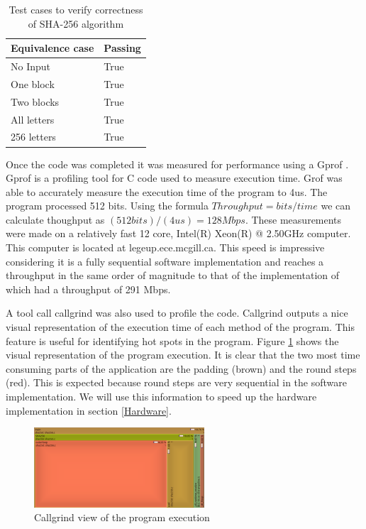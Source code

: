 \documentclass[conference]{IEEEtran}
\begin{document}
\begin{table}
\begin{center}
	\caption{Test cases to verify correctness of SHA-256 algorithm}
    \begin{tabular}{| l | l |}
    \hline
    \label{tab:tests}
    Equivalence case	 & Passing \\ \hline\hline
	No Input & True \\ \hline
	One block & True\\ \hline
	Two blocks & True \\ \hline
	All letters & True \\ \hline
	256 letters & True \\  \hline
    \hline 
    \end{tabular} 
\end{center}  
\end{table}

Once the code was completed it was measured for performance using a Gprof \cite{gprof}. Gprof is a profiling tool for C code used to measure execution time. Grof was able to accurately measure the execution time of the program to 4us. The program processed 512 bits. Using the formula $Throughput = bits/time$ we can calculate thoughput as $(512 bits)/(4us) = 128 Mbps$. These measurements were made on a relatively fast 12 core, Intel(R) Xeon(R) @ 2.50GHz computer. This computer is located at legeup.ece.mcgill.ca. This speed is impressive considering it is a fully sequential software implementation and reaches a throughput in the same order of magnitude to that of the implementation of \cite{sklav} which had a throughput of 291 Mbps.

A tool call callgrind \cite{callgrind} was also used to profile the code. Callgrind outputs a nice visual representation of the execution time of each method of the program. This feature is useful for identifying hot spots in the program. Figure \ref{fig:profile} shows the visual representation of the program execution. It is clear that the two most time consuming parts of the application are the padding (brown) and the round steps (red). This is expected because round steps are very sequential in the software implementation. We will use this information to speed up the hardware implementation in section \ref{Hardware}. 

\begin{figure}[!t]
\centering
\includegraphics[width=2.5in]{executionTime}
\caption{Callgrind view of the program execution}
\label{fig:profile}
\end{figure}
\end{document}
